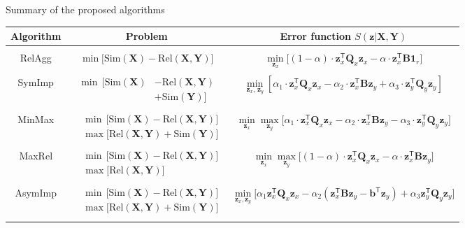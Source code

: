 \documentclass[9pt]{beamer}
\newcommand{\bz}{\mathbf{z}}
\newcommand{\bb}{\mathbf{b}}
\newcommand{\bY}{\mathbf{Y}}
\newcommand{\bX}{\mathbf{X}}
\newcommand{\bB}{\mathbf{B}}
\newcommand{\bQ}{\mathbf{Q}}
\newcommand{\bOne}{\boldsymbol{1}}
\newcommand{\T}{\mathsf{T}}
\begin{document}
\begin{frame}{Summary of the proposed algorithms}
\begin{table}
	\centering
	\footnotesize{
		\begin{tabular}{c|c|c}
			\hline
			Algorithm & Problem & Error function $S(\bz | \bX, \bY)$ \\
			\hline && \\ 
			RelAgg & $\min \bigl[ \text{Sim}(\bX) - \text{Rel}(\bX, \bY) \bigr] $ & $\min\limits_{\bz_x} \bigl[ (1 - \alpha) \cdot \bz_x^{\T} \bQ_x \bz_x - \alpha \cdot \bz_x^{\T} \bB \bOne_r \bigr] $ \\ &&\\
			SymImp & $\begin{aligned} \min \, \bigl[ \text{Sim}(\bX) & - \text{Rel}(\bX, \bY) \\ & + \text{Sim}(\bY) \bigr] \end{aligned}$ & $ \min\limits_{\bz_x, \, \bz_y} \left[ \alpha_1 \cdot \bz_x^{\T} \bQ_x \bz_x - \alpha_2 \cdot \bz_x^{\T} \bB \bz_y + \alpha_3 \cdot \bz_y^{\T} \bQ_y \bz_y \right] $\\ &&\\ 
			MinMax & $\begin{aligned} &\min \, \bigl[ \text{Sim}(\bX) - \text{Rel}(\bX, \bY) \bigr]  \\ & \max \bigl[\text{Rel}(\bX, \bY) + \text{Sim}(\bY) \bigr] \end{aligned}$ & $	\min\limits_{\bz_x} 	\max\limits_{\bz_y} \bigl[\alpha_1 \cdot \bz_x^{\T} \bQ_x \bz_x - \alpha_2 \cdot \bz_x^{\T} \bB \bz_y - \alpha_3 \cdot \bz_y^{\T} \bQ_y \bz_y \bigr]$ \\ &&\\ 
			MaxRel & $\begin{aligned} &\min \, \bigl[ \text{Sim}(\bX) - \text{Rel}(\bX, \bY) \bigr]  \\ & \max \bigl[\text{Rel}(\bX, \bY) \bigr] \end{aligned}$& $\min\limits_{\bz_x} 	\max\limits_{\bz_y} \bigl[ (1 - \alpha) \cdot \bz_x^{\T} \bQ_x \bz_x - \alpha \cdot \bz_x^{\T} \bB \bz_y \bigr]$ \\ 		&&\\
			AsymImp & $\begin{aligned} & \min \, \bigl[ \text{Sim}(\bX) - \text{Rel}(\bX, \bY) \bigr]\\ &  \max \bigl[\text{Rel}(\bX, \bY) + \text{Sim}(\bY) \bigr] \end{aligned}$ & $\min\limits_{\bz_x, \bz_y} \bigl[ \alpha_1 \bz_x^{\T} \bQ_x \bz_x - \alpha_2 \left(\bz_x^{\T} \bB \bz_y - \bb^{\T} \bz_y \right) + \alpha_3  \bz_y^{\T} \bQ_y \bz_y \bigr]$\\  && \\
			\hline
	\end{tabular}}
\end{table}
\end{frame}
\end{document}
